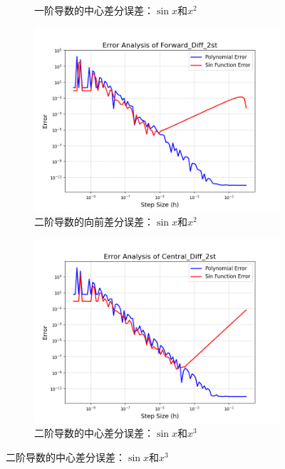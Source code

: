 \documentclass[12pt, a4paper]{article}
\begin{document}
\begin{figure}[htbp]
\begin{subfigure}[b]{0.45\textwidth}
        \caption{一阶导数的中心差分误差：$\sin x$和$x^2$}
        \label{fig: EAC1}
    \end{subfigure}
    \vspace{0.5cm}
    \centering
    \begin{subfigure}[b]{0.45\textwidth} 
        \centering
        \includegraphics[width=\textwidth]{./pictures/Error Analysis of Forward_Diff_2st.png} 
        \caption{二阶导数的向前差分误差：$\sin x$和$x^2$}
        \label{fig: EAF2}
    \end{subfigure}
    \hfill
    \begin{subfigure}[b]{0.45\textwidth} 
        \centering
        \includegraphics[width=\textwidth]{./pictures/Error Analysis of Central_Diff_2st.png} 
        \caption{二阶导数的中心差分误差：$\sin x$和$x^3$}
        \label{fig: EAC2}
    \end{subfigure}
\end{figure}
\end{document}
